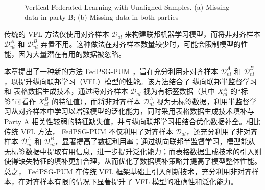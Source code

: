 \vspace{-0.1cm}
\begin{figure}[h]
	\centering
	\hspace{0.01\textwidth}  %
	
	{\centering \wuhao Vertical Federated Learning with Unaligned Samples. (a) Missing data in party B; (b) Missing data in both parties}    
	\label{fig:Missing}
\end{figure}
\vspace{-0.35cm}

传统的 VFL 方法仅使用对齐样本 $\mathcal{D}_{al}$ 来构建联邦机器学习模型，而将非对齐样本 $\mathcal{D}^A_{nl}$ 和 $\mathcal{D}^B_{nl}$ 弃置不用。这种做法在对齐样本数量较少时，可能会限制模型的性能，因为大量潜在有用的数据被忽略。

本章提出了一种新的方法  FedPSG-PUM ，旨在充分利用非对齐样本 $\mathcal{D}^A_{nl}$ 和 $\mathcal{D}^B_{nl}$，以提升纵向联邦学习（VFL）模型的性能。该方法结合了 纵向联邦半监督学习 和 表格数据生成技术，通过将对齐样本 $\mathcal{D}_{al}$ 视为有标签数据（其中 $X^A_{al}$ 的“标签”可看作 $X^B_{al}$ 的特征值），而将非对齐样本 $\mathcal{D}^A_{nl}$ 视为无标签数据，利用半监督学习从对齐样本中学习以增强模型的泛化能力，同时采用表格数据生成技术填补与 Party A 相关性较弱的特征缺失值，并与纵向联邦学习相结合优化数据补全。相比传统 VFL 方法， FedPSG-PUM  不仅利用了对齐样本 $\mathcal{D}_{al}$，还充分利用了非对齐样本 $\mathcal{D}^A_{nl}$ 和 $\mathcal{D}^B_{nl}$，显著提高了数据利用率；通过纵向联邦半监督学习，模型能从无标签数据中提取有用信息，进一步提升泛化能力；而表格数据生成技术的引入则使得缺失特征的填补更加合理，从而优化了数据填补策略并提高了模型整体性能。总之， FedPSG-PUM  在传统 VFL 框架基础上引入创新技术，充分利用非对齐样本，在对齐样本有限的情况下显著提升了 VFL 模型的准确性和泛化能力。
